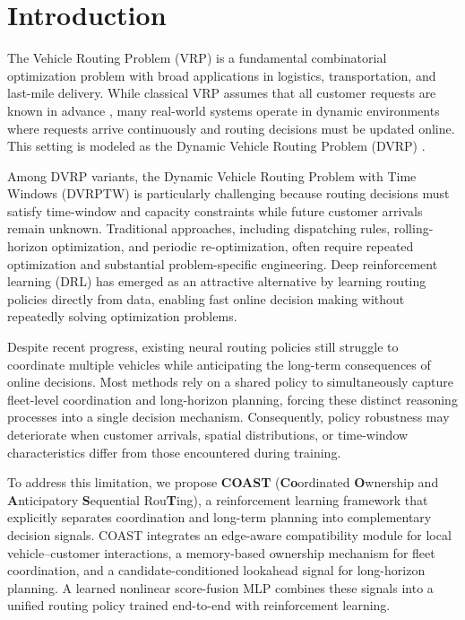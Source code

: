 \documentclass[letterpaper]{article}
\begin{document}
\section{Introduction}\label{sec:intro}

The Vehicle Routing Problem (VRP) is a fundamental combinatorial optimization problem with broad applications in logistics, transportation, and last-mile delivery. While classical VRP assumes that all customer requests are known in advance \cite{toth2014vehicle}, many real-world systems operate in dynamic environments where requests arrive continuously and routing decisions must be updated online. This setting is modeled as the Dynamic Vehicle Routing Problem (DVRP) \cite{psaraftis1988dynamic}.

Among DVRP variants, the Dynamic Vehicle Routing Problem with Time Windows (DVRPTW) is particularly challenging because routing decisions must satisfy time-window and capacity constraints while future customer arrivals remain unknown. Traditional approaches, including dispatching rules, rolling-horizon optimization, and periodic re-optimization, often require repeated optimization and substantial problem-specific engineering. Deep reinforcement learning (DRL) has emerged as an attractive alternative by learning routing policies directly from data, enabling fast online decision making without repeatedly solving optimization problems.

Despite recent progress, existing neural routing policies still struggle to coordinate multiple vehicles while anticipating the long-term consequences of online decisions. Most methods rely on a shared policy to simultaneously capture fleet-level coordination and long-horizon planning, forcing these distinct reasoning processes into a single decision mechanism. Consequently, policy robustness may deteriorate when customer arrivals, spatial distributions, or time-window characteristics differ from those encountered during training.

To address this limitation, we propose \textbf{COAST} (\textbf{Co}ordinated \textbf{O}wnership and \textbf{A}nticipatory \textbf{S}equential Rou\textbf{T}ing), a reinforcement learning framework that explicitly separates coordination and long-term planning into complementary decision signals. COAST integrates an edge-aware compatibility module for local vehicle--customer interactions, a memory-based ownership mechanism for fleet coordination, and a candidate-conditioned lookahead signal for long-horizon planning. A learned nonlinear score-fusion MLP combines these signals into a unified routing policy trained end-to-end with reinforcement learning.
\end{document}
